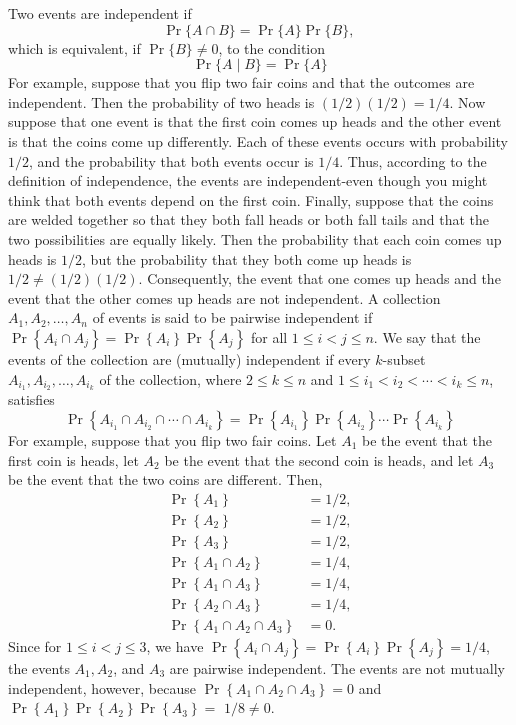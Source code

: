 \documentclass[lang=cn,newtx,10pt,scheme=chinese]{elegantbook}
\begin{document}
Two events are independent if
$$
\operatorname{Pr}\{A \cap B\}=\operatorname{Pr}\{A\} \operatorname{Pr}\{B\} \text {, }
$$
which is equivalent, if $\operatorname{Pr}\{B\} \neq 0$, to the condition
$$
\operatorname{Pr}\{A \mid B\}=\operatorname{Pr}\{A\}
$$
For example, suppose that you flip two fair coins and that the outcomes are independent. Then the probability of two heads is $(1 / 2)(1 / 2)=1 / 4$. Now suppose that one event is that the first coin comes up heads and the other event is that the coins come up differently. Each of these events occurs with probability $1 / 2$, and the probability that both events occur is $1 / 4$. Thus, according to the definition of independence, the events are independent-even though you might think that both events depend on the first coin. Finally, suppose that the coins are welded together so that they both fall heads or both fall tails and that the two possibilities are equally likely. Then the probability that each coin comes up heads is $1 / 2$, but the probability that they both come up heads is $1 / 2 \neq(1 / 2)(1 / 2)$. Consequently, the event that one comes up heads and the event that the other comes up heads are not independent.
A collection $A_1, A_2, \ldots, A_n$ of events is said to be pairwise independent if $\operatorname{Pr}\left\{A_i \cap A_j\right\}=\operatorname{Pr}\left\{A_i\right\} \operatorname{Pr}\left\{A_j\right\}$
for all $1 \leq i<j \leq n$. We say that the events of the collection are (mutually) independent if every $k$-subset $A_{i_1}, A_{i_2}, \ldots, A_{i_k}$ of the collection, where $2 \leq k \leq n$ and $1 \leq i_1<i_2<\cdots<i_k \leq n$, satisfies
$$
\operatorname{Pr}\left\{A_{i_1} \cap A_{i_2} \cap \cdots \cap A_{i_k}\right\}=\operatorname{Pr}\left\{A_{i_1}\right\} \operatorname{Pr}\left\{A_{i_2}\right\} \cdots \operatorname{Pr}\left\{A_{i_k}\right\}
$$
For example, suppose that you flip two fair coins. Let $A_1$ be the event that the first coin is heads, let $A_2$ be the event that the second coin is heads, and let $A_3$ be the event that the two coins are different. Then,
$$
\begin{aligned}
\operatorname{Pr}\left\{A_1\right\} & =1 / 2, \\
\operatorname{Pr}\left\{A_2\right\} & =1 / 2, \\
\operatorname{Pr}\left\{A_3\right\} & =1 / 2, \\
\operatorname{Pr}\left\{A_1 \cap A_2\right\} & =1 / 4, \\
\operatorname{Pr}\left\{A_1 \cap A_3\right\} & =1 / 4, \\
\operatorname{Pr}\left\{A_2 \cap A_3\right\} & =1 / 4, \\
\operatorname{Pr}\left\{A_1 \cap A_2 \cap A_3\right\} & =0 .
\end{aligned}
$$
Since for $1 \leq i<j \leq 3$, we have $\operatorname{Pr}\left\{A_i \cap A_j\right\}=\operatorname{Pr}\left\{A_i\right\} \operatorname{Pr}\left\{A_j\right\}=1 / 4$, the events $A_1, A_2$, and $A_3$ are pairwise independent. The events are not mutually independent, however, because $\operatorname{Pr}\left\{A_1 \cap A_2 \cap A_3\right\}=0$ and $\operatorname{Pr}\left\{A_1\right\} \operatorname{Pr}\left\{A_2\right\} \operatorname{Pr}\left\{A_3\right\}=$ $1 / 8 \neq 0$.
\end{document}
